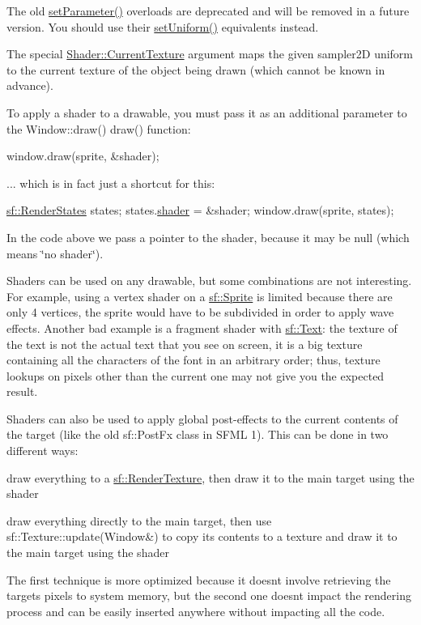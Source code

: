 The old \hyperlink{classsf_1_1_shader_a4d6ec78f6de1a0a2146c93ab09d7d762}{set\+Parameter()} overloads are deprecated and will be removed in a future version. You should use their \hyperlink{classsf_1_1_shader_abf78e3bea1e9b0bab850b6b0a0de29c7}{set\+Uniform()} equivalents instead.

The special \hyperlink{classsf_1_1_shader_ac84c7953eec2e19358ea6e2cc5385b8d}{Shader\+::\+Current\+Texture} argument maps the given {\ttfamily sampler2D} uniform to the current texture of the object being drawn (which cannot be known in advance).

To apply a shader to a drawable, you must pass it as an additional parameter to the Window\+::draw() draw() function\+: 
\begin{DoxyCode}
window.draw(sprite, &shader);
\end{DoxyCode}


... which is in fact just a shortcut for this\+: 
\begin{DoxyCode}
\hyperlink{classsf_1_1_render_states}{sf::RenderStates} states;
states.\hyperlink{classsf_1_1_render_states_ad4f79ecdd0c60ed0d24fbe555b221bd8}{shader} = &shader;
window.draw(sprite, states);
\end{DoxyCode}


In the code above we pass a pointer to the shader, because it may be null (which means \char`\"{}no shader\char`\"{}).

Shaders can be used on any drawable, but some combinations are not interesting. For example, using a vertex shader on a \hyperlink{classsf_1_1_sprite}{sf\+::\+Sprite} is limited because there are only 4 vertices, the sprite would have to be subdivided in order to apply wave effects. Another bad example is a fragment shader with \hyperlink{classsf_1_1_text}{sf\+::\+Text}\+: the texture of the text is not the actual text that you see on screen, it is a big texture containing all the characters of the font in an arbitrary order; thus, texture lookups on pixels other than the current one may not give you the expected result.

Shaders can also be used to apply global post-\/effects to the current contents of the target (like the old sf\+::\+Post\+Fx class in S\+F\+ML 1). This can be done in two different ways\+: \begin{DoxyItemize}
\item draw everything to a \hyperlink{classsf_1_1_render_texture}{sf\+::\+Render\+Texture}, then draw it to the main target using the shader \item draw everything directly to the main target, then use sf\+::\+Texture\+::update(\+Window\&) to copy its contents to a texture and draw it to the main target using the shader\end{DoxyItemize}
The first technique is more optimized because it doesn\textquotesingle{}t involve retrieving the target\textquotesingle{}s pixels to system memory, but the second one doesn\textquotesingle{}t impact the rendering process and can be easily inserted anywhere without impacting all the code.

